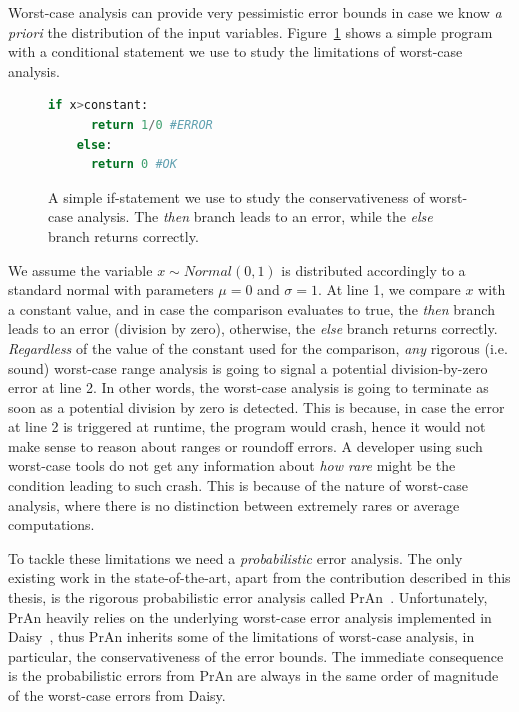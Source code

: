 Worst-case analysis can provide very pessimistic error bounds in case we know \emph{a priori} the distribution of the input variables. 
%
%
Figure~\ref{fig:prob} shows a simple program with a conditional statement we use to study the limitations of worst-case analysis.
%
\begin{figure}[tb!]
	\begin{lstlisting}[frame=single, language=Python]
	if x>constant:
	  return 1/0 #ERROR
	else:
	  return 0 #OK
	\end{lstlisting}
	\caption{A simple if-statement we use to study the conservativeness of worst-case analysis. The \emph{then} branch leads to an error, while the \emph{else} branch returns correctly.}
	\label{fig:prob}
\end{figure}
%
We assume the variable $x\sim Normal(0,1)$ is distributed accordingly to a standard normal with parameters $\mu = 0$ and $\sigma = 1$.
%
At line 1, we compare $x$ with a constant value, and in case the comparison evaluates to true, the \emph{then} branch leads to an error (division by zero), otherwise, the \emph{else} branch returns correctly.
%
\emph{Regardless} of the value of the constant used for the comparison, \emph{any} rigorous (i.e. sound) worst-case range analysis is going to signal a potential division-by-zero error at line 2.
%
In other words, the worst-case analysis is going to terminate as soon as a potential division by zero is detected.
%
This is because, in case the error at line 2 is triggered at runtime, the program would crash, hence it would not make sense to reason about ranges or roundoff errors.
%
A developer using such worst-case tools do not get any information about \emph{how rare} might be the condition leading to such crash.
%
This is because of the nature of worst-case analysis, where there is no distinction between extremely rares or average computations.
%

To tackle these limitations we need a \emph{probabilistic} error analysis.
%
The only existing work in the state-of-the-art, apart from the contribution described in this thesis, is the rigorous probabilistic error analysis called PrAn~\cite{probdaisy}.
%
Unfortunately, PrAn heavily relies on the underlying worst-case error analysis implemented in Daisy~\cite{darulova2018daisy}, thus PrAn inherits some of the limitations of worst-case analysis, in particular, the conservativeness of the error bounds.
%
The immediate consequence is the probabilistic errors from PrAn are always in the same order of magnitude of the worst-case errors from Daisy.
%


